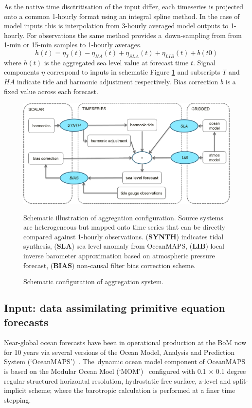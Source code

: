 As the native time disctritisation of the input differ, each timeseries is projected onto a common 1-hourly format using an integral spline method.  
In the case of model inputs this is interpolation from 3-hourly averaged model outputs to 1-hourly.  
For observations the same method provides a~down-sampling from from 1-min or 15-min samples to 1-hourly averages.  
\begin{equation}
h(t) = \eta_{T}(t) - \eta_{HA}(t) + \eta_{SLA}(t) + \eta_{LIB}(t) + b(t0)
\label{eq:aggSL}
\end{equation}
where $h(t)$ is the aggregated sea level value at forecast time $t$.  
Signal components $\eta$ correspond to inputs in schematic Figure \ref{fig:aggSL} and subscripts $T$ and $HA$ indicate tide and harmonic adjustment respectively.    
Bias correction $b$ is a fixed value across each forecast.
\begin{figure}[H]
\centering
\includegraphics[width=1.0\textwidth]{figures/diagrams/aggSL_schematic_abstract.png}
\caption{Schematic configuration of aggregation system.}
{Schematic illustration of aggregation configuration.  Source systems are heterogeneous but mapped onto time series that can be directly compared against 1-hourly observations.  (\textbf{SYNTH}) indicates tidal synthesis, (\textbf{SLA}) sea level anomaly from OceanMAPS, (\textbf{LIB}) local inverse barometer approximation based on atmospheric pressure forecast, (\textbf{BIAS}) non-causal filter bias correction scheme. }
\label{fig:aggSL}
\end{figure}   


\subsection{Input: data assimilating primitive equation forecasts }
\label{sec:dynamicmodels}

Near-global ocean forecasts have been in operational production at the BoM now for 10 years via several versions of the Ocean Model, Analysis and Prediction System (`OceanMAPS')~\citep{Brassington:2007ut,NMOC:2007wq,BureauofMeterology:2011ta,Brassington:2012wm}.
The~dynamic ocean model component of OceanMAPS is based on the Modular Ocean Moel (`MOM')~\citep{Griffies:2008vh} configured with 0.1 $\times$ 0.1 degree regular structured horizontal resolution, hydrostatic free surface, z-level and split-implicit scheme; where the barotropic calculation is performed at a finer time stepping. 

